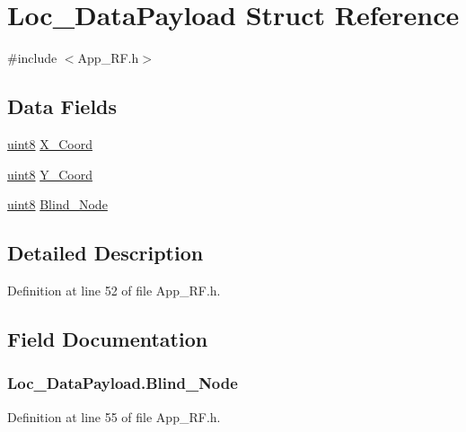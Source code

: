 \hypertarget{struct_loc___data_payload}{
\section{Loc\_\-DataPayload Struct Reference}
\label{struct_loc___data_payload}
}


{\ttfamily \#include $<$App\_\-RF.h$>$}

\subsection*{Data Fields}
\begin{DoxyCompactItemize}
\item 
\hyperlink{hal__types_8h_adde6aaee8457bee49c2a92621fe22b79}{uint8} \hyperlink{struct_loc___data_payload_a6669b0646254b2c5fe8a47029330ca31}{X\_\-Coord}
\item 
\hyperlink{hal__types_8h_adde6aaee8457bee49c2a92621fe22b79}{uint8} \hyperlink{struct_loc___data_payload_a23be92cb56ffff4211182f81a2c8025b}{Y\_\-Coord}
\item 
\hyperlink{hal__types_8h_adde6aaee8457bee49c2a92621fe22b79}{uint8} \hyperlink{struct_loc___data_payload_acab51a4bb5ed18bb82b88487f8a16d49}{Blind\_\-Node}
\end{DoxyCompactItemize}


\subsection{Detailed Description}


Definition at line 52 of file App\_\-RF.h.



\subsection{Field Documentation}
\hypertarget{struct_loc___data_payload_acab51a4bb5ed18bb82b88487f8a16d49}{
\subsubsection[{Blind\_\-Node}]{ {\bf Loc\_\-DataPayload.Blind\_\-Node}}}
\label{struct_loc___data_payload_acab51a4bb5ed18bb82b88487f8a16d49}


Definition at line 55 of file App\_\-RF.h.

